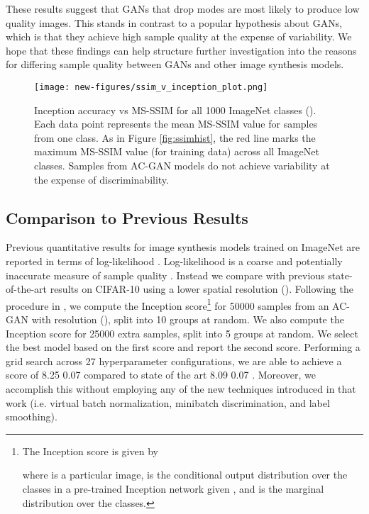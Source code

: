 \documentclass{article}
\begin{document}
These results suggest that GANs that drop modes are most likely to produce
low quality images.
This stands in contrast to a popular hypothesis about GANs,
which is that they achieve high sample quality at the expense of variability.
We hope that these findings can help structure further investigation
into the reasons for differing sample quality between GANs and
other image synthesis models.

\begin{figure}[h]
\centering\texttt{[image: new-figures/ssim\_v\_inception\_plot.png]}

\caption{
Inception accuracy vs MS-SSIM for all 1000 ImageNet classes ().
Each data point represents the mean MS-SSIM value for samples from one class.
As in Figure \ref{fig:ssimhist}, the red line marks the maximum MS-SSIM value (for training data)
across all ImageNet classes.
Samples from AC-GAN models do not achieve variability at the expense of discriminability.
}\vspace{-10pt}
\label{fig:ssimvinceptionfig}
\end{figure}

\subsection{Comparison to Previous Results} \label{section:inceptionscore}

Previous quantitative results for image synthesis models trained on ImageNet
are reported in terms of log-likelihood \citep{PIXELRNN, PIXELCNN}.
Log-likelihood is a coarse and potentially inaccurate measure of sample quality
\citep{TheisEtAl}. 
Instead we compare with previous state-of-the-art results on CIFAR-10
using a lower spatial resolution ().
Following the procedure in \cite{IMPROVEDTECHNIQUES},
we compute the Inception score\footnote{
The Inception score is given by

where  is a particular image,  is the conditional output distribution over
the classes in a pre-trained Inception network \citep{INCEPTION} given ,
and  is the marginal distribution over the classes.
}
for 50000 samples from an AC-GAN with resolution (),
split into 10 groups at random.
We also compute the Inception score for 25000 extra samples,
split into 5 groups at random.
We select the best model based on the first score and report the second score.
Performing a grid search across 27 hyperparameter configurations,
we are able to achieve a score of 8.25  0.07
compared to state of the art 
8.09  0.07 \citep{IMPROVEDTECHNIQUES}.
Moreover, we accomplish this without employing any of the new techniques
introduced in that work (i.e. virtual batch normalization,
minibatch discrimination, and label smoothing).
\end{document}
